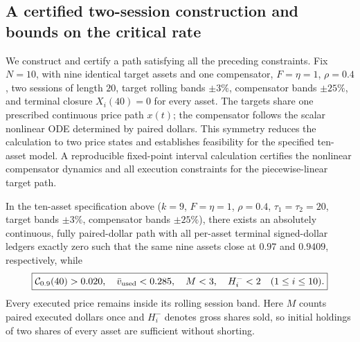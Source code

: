 \documentclass[review,hidelinks,onefignum,onetabnum]{siamonline250211}
\begin{document}
\subsection{A certified two-session construction and bounds on the critical rate}\label{subsec:v7-certified}
We construct and certify a path satisfying all the preceding constraints. Fix $N=10$, with nine identical target assets and one compensator, $F=\eta=1$, $\rho=0.4$, two sessions of length $20$, target rolling bands $\pm3\%$, compensator bands $\pm25\%$, and terminal closure $X_i(40)=0$ for every asset. The targets share one prescribed continuous price path $x(t)$; the compensator follows the scalar nonlinear ODE determined by paired dollars. This symmetry reduces the calculation to two price states and establishes feasibility for the specified ten-asset model. A reproducible fixed-point interval calculation certifies the nonlinear compensator dynamics and all execution constraints for the piecewise-linear target path.
\begin{proposition}\label{prop:certified-v7}
In the ten-asset specification above ($k=9$, $F=\eta=1$, $\rho=0.4$, $\tau_1=\tau_2=20$, target bands $\pm3\%$, compensator bands $\pm25\%$), there exists an absolutely continuous, fully paired-dollar path with all per-asset terminal signed-dollar ledgers exactly zero such that the same nine assets close at $0.97$ and $0.9409$, respectively, while
\begin{equation}\label{eq:v7-certified-result}
\boxed{\mathcal{C}_{0.9}(40)>0.020,\quad \bar v_{\mathrm{used}}<0.285,\quad M<3,\quad H_i^-<2\quad(1\le i\le10).}
\end{equation}
Every executed price remains inside its rolling session band. Here $M$ counts paired executed dollars once and $H_i^-$ denotes gross shares sold, so initial holdings of two shares of every asset are sufficient without shorting.
\end{proposition}
\end{document}
